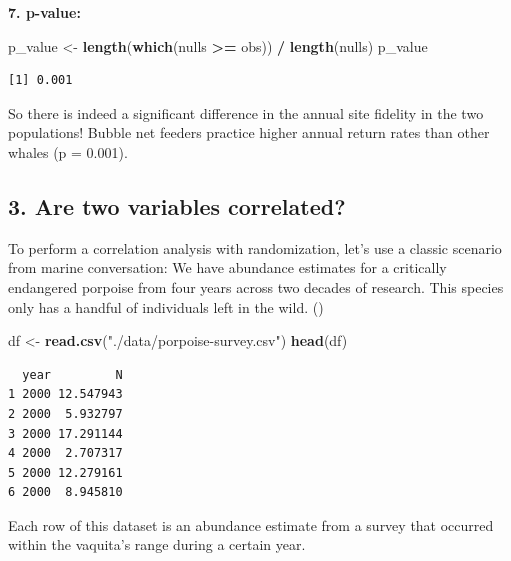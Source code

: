 \documentclass[
]{book}
\newenvironment{Shaded}{\begin{snugshade}}{\end{snugshade}}
\newcommand{\DataTypeTok}[1]{\textcolor[rgb]{0.13,0.29,0.53}{#1}}
\newcommand{\DecValTok}[1]{\textcolor[rgb]{0.00,0.00,0.81}{#1}}
\newcommand{\KeywordTok}[1]{\textcolor[rgb]{0.13,0.29,0.53}{\textbf{#1}}}
\newcommand{\NormalTok}[1]{#1}
\newcommand{\OperatorTok}[1]{\textcolor[rgb]{0.81,0.36,0.00}{\textbf{#1}}}
\newcommand{\StringTok}[1]{\textcolor[rgb]{0.31,0.60,0.02}{#1}}
\begin{document}
\textbf{7. p-value:}

\begin{Shaded}
\begin{Highlighting}[]
\NormalTok{p_value <-}\StringTok{ }\KeywordTok{length}\NormalTok{(}\KeywordTok{which}\NormalTok{(nulls }\OperatorTok{>=}\StringTok{ }\NormalTok{obs)) }\OperatorTok{/}\StringTok{ }\KeywordTok{length}\NormalTok{(nulls)}
\NormalTok{p_value}
\end{Highlighting}
\end{Shaded}

\begin{verbatim}
[1] 0.001
\end{verbatim}

So there is indeed a significant difference in the annual site fidelity in the two populations! Bubble net feeders practice higher annual return rates than other whales (p = 0.001).

\hypertarget{are-two-variables-correlated}{%
\subsection*{3. Are two variables correlated?}\label{are-two-variables-correlated}}

To perform a correlation analysis with randomization, let's use a classic scenario from marine conversation: We have abundance estimates for a critically endangered porpoise from four years across two decades of research. This species only has a handful of individuals left in the wild. ()

\begin{Shaded}
\begin{Highlighting}[]
\NormalTok{df <-}\StringTok{ }\KeywordTok{read.csv}\NormalTok{(}\StringTok{"./data/porpoise-survey.csv"}\NormalTok{)}
\KeywordTok{head}\NormalTok{(df)}
\end{Highlighting}
\end{Shaded}

\begin{verbatim}
  year         N
1 2000 12.547943
2 2000  5.932797
3 2000 17.291144
4 2000  2.707317
5 2000 12.279161
6 2000  8.945810
\end{verbatim}

Each row of this dataset is an abundance estimate from a survey that occurred within the vaquita's range during a certain year.

\begin{Shaded}
\end{Shaded}
\end{document}
